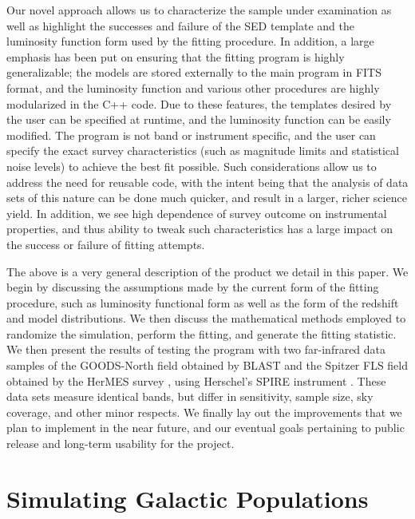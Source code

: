 \documentclass[twocolumn,letterpaper,10pt]{article}
\begin{document}
Our novel approach allows us to characterize the sample under examination as well as highlight the successes and failure of the SED template and the luminosity function form used by the fitting procedure. In addition, a large emphasis has been put on ensuring that the fitting program is highly generalizable; the models are stored externally to the main program in FITS format, and the luminosity function and various other procedures are highly modularized in the C++ code. Due to these features, the templates desired by the user can be specified at runtime, and the luminosity function can be easily modified. The program is not band or instrument specific, and the user can specify the exact survey characteristics (such as magnitude limits and statistical noise levels) to achieve the best fit possible. Such considerations allow us to address the need for reusable code, with the intent being that the analysis of data sets of this nature can be done much quicker, and result in a larger, richer science yield. In addition, we see high dependence of survey outcome on instrumental properties, and thus ability to tweak such characteristics has a large impact on the success or failure of fitting attempts.

The above is a very general description of the product we detail in this paper. We begin by discussing the assumptions made by the current form of the fitting procedure, such as luminosity functional form as well as the form of the redshift and model distributions. We then discuss the mathematical methods employed to randomize the simulation, perform the fitting, and generate the fitting statistic. We then present the results of testing the program with two far-infrared data samples of the GOODS-North field obtained by BLAST \citep{BLAST} and the Spitzer FLS field obtained by the HerMES survey \citep{HerMES}, using Herschel's SPIRE instrument \citep{Herschel,SPIRE}. These data sets measure identical bands, but differ in sensitivity, sample size, sky coverage, and other minor respects. We finally lay out the improvements that we plan to implement in the near future, and our eventual goals pertaining to public release and long-term usability for the project. 

\section{Simulating Galactic Populations}
\end{document}
